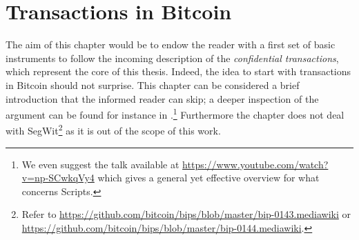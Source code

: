\chapter{Transactions in Bitcoin}
\label{chpr:tx}
The aim of this chapter would be to endow the reader with a first set of basic instruments to follow the incoming description of the \textit{confidential transactions}, which represent the core of this thesis. Indeed, the idea to start with transactions in Bitcoin should not surprise. This chapter can be considered a brief introduction that the informed reader can skip; a deeper inspection of the argument can be found for instance in \cite{BitcoinDev, MasteringBitcoin, PedroFranco}.\footnote{We even suggest the talk available at \url{https://www.youtube.com/watch?v=np-SCwkqVy4} which gives a general yet effective overview for what concerns Scripts.} Furthermore the chapter does not deal with SegWit\footnote{Refer to \url{https://github.com/bitcoin/bips/blob/master/bip-0143.mediawiki} or 
\url{https://github.com/bitcoin/bips/blob/master/bip-0144.mediawiki}.} as it is out of the scope of this work.

